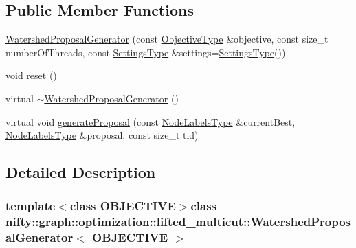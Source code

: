 \subsection*{Public Member Functions}
\begin{DoxyCompactItemize}
\item 
\hyperlink{classnifty_1_1graph_1_1optimization_1_1lifted__multicut_1_1WatershedProposalGenerator_aebed03b660b6d552bd93248d3d11669f}{Watershed\+Proposal\+Generator} (const \hyperlink{classnifty_1_1graph_1_1optimization_1_1lifted__multicut_1_1WatershedProposalGenerator_a6d15e32fd68f785c92ee9ee909e84a4d}{Objective\+Type} \&objective, const size\+\_\+t number\+Of\+Threads, const \hyperlink{structnifty_1_1graph_1_1optimization_1_1lifted__multicut_1_1WatershedProposalGenerator_1_1SettingsType}{Settings\+Type} \&settings=\hyperlink{structnifty_1_1graph_1_1optimization_1_1lifted__multicut_1_1WatershedProposalGenerator_1_1SettingsType}{Settings\+Type}())
\item 
void \hyperlink{classnifty_1_1graph_1_1optimization_1_1lifted__multicut_1_1WatershedProposalGenerator_a35f7d2b7fd5385895150f8e65d966174}{reset} ()
\item 
virtual \hyperlink{classnifty_1_1graph_1_1optimization_1_1lifted__multicut_1_1WatershedProposalGenerator_ad22a9876293b2bf9f5aff08b759842b7}{$\sim$\+Watershed\+Proposal\+Generator} ()
\item 
virtual void \hyperlink{classnifty_1_1graph_1_1optimization_1_1lifted__multicut_1_1WatershedProposalGenerator_aca5443091b98cb7fcee4dcc2785a63cf}{generate\+Proposal} (const \hyperlink{classnifty_1_1graph_1_1optimization_1_1lifted__multicut_1_1ProposalGeneratorBase_a908a9320edb8af8735bc68481224b75e}{Node\+Labels\+Type} \&current\+Best, \hyperlink{classnifty_1_1graph_1_1optimization_1_1lifted__multicut_1_1ProposalGeneratorBase_a908a9320edb8af8735bc68481224b75e}{Node\+Labels\+Type} \&proposal, const size\+\_\+t tid)
\end{DoxyCompactItemize}


\subsection{Detailed Description}
\subsubsection*{template$<$class O\+B\+J\+E\+C\+T\+I\+V\+E$>$class nifty\+::graph\+::optimization\+::lifted\+\_\+multicut\+::\+Watershed\+Proposal\+Generator$<$ O\+B\+J\+E\+C\+T\+I\+V\+E $>$}

